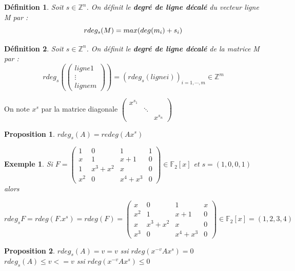 \documentclass[a4paper,12pt]{report}  %
\theoremstyle{definitionstyle}
\newtheorem{definition}{Définition}[chapter] %
\theoremstyle{examplestyle}
\newtheorem{example}{Exemple}[chapter] %
\theoremstyle{remarkstyle}
\theoremstyle{propositionstyle}
\newtheorem{proposition}{Proposition}[chapter]  %
\theoremstyle{theoremstyle}
\theoremstyle{proofstyle}
\begin{document}
	\begin{definition}
		Soit $s \in \mathbb{Z}^n$. On définit le \textbf{degré de ligne décalé} du vecteur ligne M par :
		$$rdeg_s(M)=max(deg(m_i)+s_i\\)$$
	\end{definition}

\begin{definition}
	Soit $s \in \mathbb{Z}^n$. On définit le \textbf{degré de ligne décalé} de la matrice M par :
	$$rdeg_s
	\left( \left(
	\begin{array}{r}
		ligne 1 \\ 
		\vdots \\
		ligne m
	\end{array} 
\right) \right)=(rdeg_s(ligne i))_{i=1, \cdots, m}\in \mathbb{Z}^m$$
\end{definition}
	
On note $x^s$ par la matrice diagonale 
$\left(\begin{array}{rrr}
	x^{s_1} &        & \\
		    & \ddots & \\
		    &        & x^{s_n}
	\end{array}\right)$

\begin{proposition}
	$rdeg_s(A) = redeg (A x^s)$
\end{proposition}

\begin{example}
	Si $F =
	\left(\begin{array}{rrrr}
	 	1 & 0 & 1 & 1 \\
		x & 1 & x + 1 & 0 \\
		1 & x^{3} + x^{2} & x & 0 \\
		x^{2} & 0 & x^{4} + x^{3} & 0
	\end{array}\right) \in \mathbb{F}_2[x]
	$ et $s =(1, 0, 0, 1)$ alors 
	
	$rdeg_s F = rdeg (F . x^s) = rdeg(F) =
	\left(\begin{array}{rrrr}
		x & 0 & 1 & x \\
		x^2 & 1 & x + 1 & 0 \\
		x & x^{3} + x^{2} & x & 0 \\
		x^{3} & 0 & x^{4} + x^{3} & 0
	\end{array}\right) \in \mathbb{F}_2[x]
	=(1, 2, 3, 4)$
\end{example}
	
\begin{proposition}
	
	$rdeg_s(A)=v = v$ ssi $rdeg(x^{-v} A x^s) = 0$
	$rdeg_s(A)\leq v <= v$ ssi $rdeg(x^{-v} A x^s)\leq 0$
	
\end{proposition}
	
\end{document}
